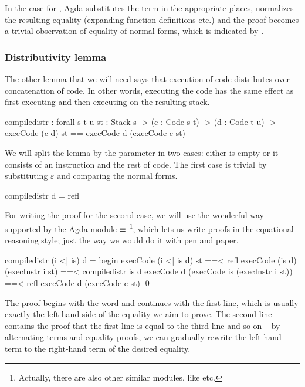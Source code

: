 In the case for , Agda substitutes the term  in the
appropriate places, normalizes the resulting equality (expanding function
definitions etc.) and the proof becomes a trivial observation of equality
of normal forms, which is indicated by .

\subsubsection{Distributivity lemma}

The other lemma that we will need says that execution of code distributes over
concatenation of code. In other words, executing the code  has the same effect as first executing  and then executing
 on the resulting stack.

\begin{code}
  compile\-distr : forall {s t u} {st : Stack s}
    -> (c : Code s t) -> (d : Code t u)
    -> execCode (c \app d) st == execCode d (execCode c st)
\end{code}

We will split the lemma by the parameter  in two cases: either
 is empty or it consists of an instruction and the rest of code. The
first case is trivial by substituting $\varepsilon$ and comparing the normal
forms.

\begin{code}
  compile\-distr \nil d = refl
\end{code}

\noindent For writing the proof for the second case, we will use the wonderful
way supported by the Agda module $\mathsf{\equiv}$-\footnote{Actually,
there are also other similar modules, like  etc.}, which
lets us write proofs in the equational-reasoning style; just the way we would
do it with pen and paper.

\begin{code}
  compile\-distr (i <| is) d = begin
    execCode (i <| is \app d) st
      ==< refl \>
    execCode (is \app d) (execInstr i st)
      ==< compile\-distr is d \>
    execCode d (execCode is (execInstr i st))
      ==< refl \>
    execCode d (execCode c st)
    \qed
\end{code}

\noindent The proof begins with the word  and continues with the
first line, which is usually exactly the left-hand side of the equality we aim
to prove.  The second line contains the proof that the first line is equal to
the third line and so on -- by alternating terms and equality proofs, we can
gradually rewrite the left-hand term to the right-hand term of the desired
equality.

